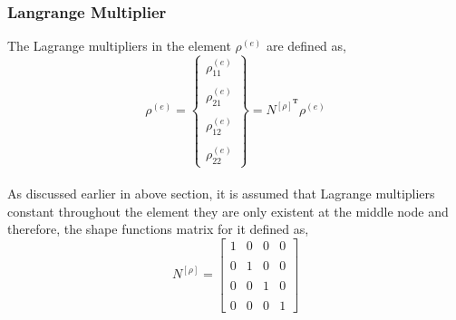 \documentclass[12pt]{article}
\begin{document}
\subsubsection{ Langrange Multiplier}
The Lagrange multipliers in the element $ \rho^{(e)}$ are defined as,
\begin{equation}
\rho^{(e)}=
\begin{Bmatrix}
\rho_{11}^{(e)} \\
\\
\rho_{21}^{(e)} \\
\\
\rho_{12}^{(e)} \\
\\
\rho_{22}^{(e)}
\end{Bmatrix}
=N^{[\rho]^{\textbf{T}}}\rho^{(e)}
\end{equation}
\\
As discussed earlier in above section, it is assumed that  Lagrange multipliers constant throughout the element they are only existent at the middle node and therefore, the shape functions matrix for it defined as,
\begin{equation}
N^{[\rho]}=
\begin{bmatrix}
1&0&0&0 \\
\\
0&1&0&0 \\
\\
0&0&1&0 \\
\\
0&0&0&1
\end{bmatrix}
\end{equation}
\newpage
\end{document}
